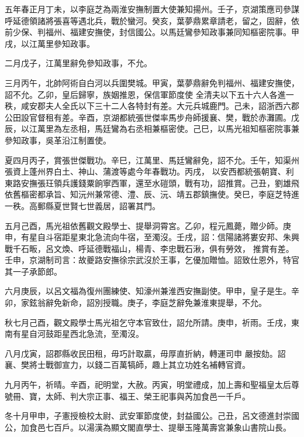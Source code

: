 \begin{pinyinscope}
 五年春正月丁未，以李庭芝為兩淮安撫制置大使兼知揚州。壬子，京湖策應司參謀呼延德領諸將張喜等遇北兵，戰於蠻河。癸亥，葉夢鼎累章請老，留之，固辭，依前少保、判福州、福建安撫使，封信國公。以馬廷鸞參知政事兼同知樞密院事。甲戌，以江萬里參知政事。



 二月戊子，江萬里辭免參知政事，不允。



 三月丙午，北帥阿術自白河以兵圍樊城。甲寅，葉夢鼎辭免判福州、福建安撫使，詔不允。乙卯，皇后歸寧，族姻推恩，保信軍節度使
 全清夫以下五十六人各進一秩，咸安郡夫人全氏以下三十二人各特封有差。大元兵城鹿門。己未，詔浙西六郡公田設官督租有差。辛酉，京湖都統張世傑率馬步舟師援襄、樊，戰於赤灘圃。戊辰，以江萬里為左丞相，馬廷鸞為右丞相兼樞密使。己巳，以馬光祖知樞密院事兼參知政事，吳革沿江制置使。



 夏四月丙子，賞張世傑戰功。辛巳，江萬里、馬廷鸞辭免，詔不允。壬午，知渠州張資上蓬州界白土、神山、蒲渡等處今年春戰功。丙戌，
 以安西都統張朝寶、利東路安撫張玨領兵護錢粟餉寧西軍，還至水磑頭，戰有功，詔推賞。己丑，劉雄飛依舊樞密都承旨、知沅州兼常德、澧、辰、沅、靖五郡鎮撫使。癸巳，李庭芝特進一秩。高郵縣夏世賢七世義居，詔署其門。



 五月己酉，馬光祖依舊觀文殿學士、提舉洞霄宮。乙卯，程元鳳薨，贈少師。庚申，有星自斗宿距星東北急流向牛宿，至濁沒。壬戌，詔：信陽諸將婁安邦、朱興戰千石畈，呂文煥、呼延德戰福山，楊青、李忠戰石湫，俱有勞效，
 推賞有差。壬申，京湖制司言：故夔路安撫徐宗武沒於王事，乞優加贈恤。詔致仕恩外，特官其一子承節郎。



 六月庚辰，以呂文福為復州團練使、知濠州兼淮西安撫副使。甲申，皇子是生。辛卯，家鉉翁辭免新命，詔別授職。庚子，李庭芝辭免兼淮東提舉，不允。



 秋七月己酉，觀文殿學士馬光祖乞守本官致仕，詔允所請。庚申，祈雨。壬戌，東南有星自河鼓距星西北急流，至濁沒。



 八月戊寅，詔郡縣收民田租，毋巧計取贏，毋厚直折納，轉運司申
 嚴按劾。詔襄、樊將士戰御宣力，以錢二百萬犒師，趣上其立功姓名補轉官資。



 九月丙午，祈晴。辛酉，祀明堂，大赦。丙寅，明堂禮成，加上壽和聖福皇太后尊號冊、寶，太師、判大宗正事、福王、榮王祀事與芮加食邑一千戶。



 冬十月甲申，子憲授檢校太尉、武安軍節度使，封益國公。己丑，呂文德進封崇國公，加食邑七百戶。以湯漢為顯文閣直學士、提舉玉隆萬壽宮兼象山書院山長。




\end{pinyinscope}
